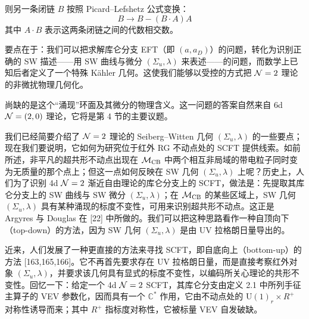 
则另一条闭链 $B$ 按照 Picard--Lefshetz 公式变换：
\begin{equation}
  B \to B - (B\cdot A)A
  \tag{3.36}
\end{equation}
其中 $A\cdot B$ 表示这两条闭链之间的代数相交数。


要点在于：我们可以把求解库仑分支 EFT（即 $(a,a_D)$）的问题，转化为识别正确的 SW 描述——用 SW 曲线与微分 $(\Sigma_u,\lambda)$ 来表述——的问题，而数学上已知后者定义了一个特殊 Kähler 几何。这使我们能够以受控的方式把 $\mathcal{N}=2$ 理论的非微扰物理几何化。

尚缺的是这个“涌现”环面及其微分的物理含义。这一问题的答案自然来自 6d $\mathcal{N}=(2,0)$ 理论，它将是第 4 节的主要议题。


我们已经简要介绍了 $\mathcal{N}=2$ 理论的 Seiberg--Witten 几何 $(\Sigma_u,\lambda)$ 的一些要点；现在我们要说明，它如何为研究位于红外 RG 不动点处的 SCFT 提供线索。如前所述，非平凡的超共形不动点出现在 $\mathcal{M}_{\mathrm{CB}}$ 中两个相互非局域的带电粒子同时变为无质量的那个点上；但这一点如何反映在 SW 几何 $(\Sigma_u,\lambda)$ 上呢？历史上，人们为了识别 4d $\mathcal{N}=2$ 渐近自由理论的库仑分支上的 SCFT，做法是：先提取其库仑分支上的 SW 曲线与 SW 微分 $(\Sigma_u,\lambda)$；在 $\mathcal{M}_{\mathrm{CB}}$ 的某些区域上，SW 几何 $(\Sigma_u,\lambda)$ 具有某种涌现的标度不变性，可用来识别超共形不动点。这正是 Argyres 与 Douglas 在 [22] 中所做的。我们可以把这种思路看作一种自顶向下（top-down）的方法，因为 SW 几何 $(\Sigma_u,\lambda)$ 是由 UV 拉格朗日量导出的。

近来，人们发展了一种更直接的方法来寻找 SCFT，即自底向上（bottom-up）的方法 [163,165,166]。它不再首先要求存在 UV 拉格朗日量，而是直接考察红外对象 $(\Sigma_u,\lambda)$，并要求该几何具有显式的标度不变性，以编码所关心理论的共形不变性。回忆一下：给定一个 4d $\mathcal{N}=2$ SCFT，其库仑分支由定义 2.1 中所列手征主算子的 VEV 参数化，因而具有一个 $\mathbb{C}^*$ 作用，它由不动点处的 $\mathrm{U}(1)_r\times R^+$ 对称性诱导而来；其中 $R^+$ 指标度对称性，它被标量 VEV 自发破缺。

